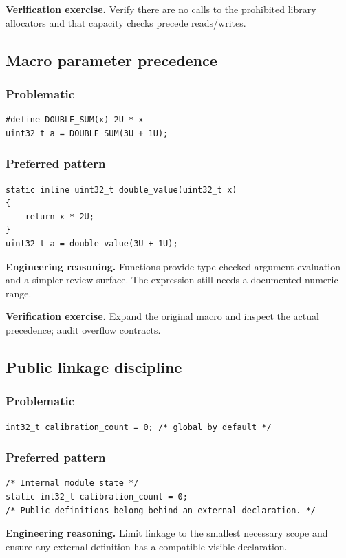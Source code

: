 \documentclass[10pt,letterpaper]{article}
\begin{document}
\textbf{Verification exercise.} Verify there are no calls to the prohibited library allocators and that capacity checks precede reads/writes.

\subsection{Macro parameter precedence}
\subsubsection*{Problematic}
\begin{lstlisting}[style=engineerc]
#define DOUBLE_SUM(x) 2U * x
uint32_t a = DOUBLE_SUM(3U + 1U);
\end{lstlisting}
\subsubsection*{Preferred pattern}
\begin{lstlisting}[style=engineerc]
static inline uint32_t double_value(uint32_t x)
{
    return x * 2U;
}
uint32_t a = double_value(3U + 1U);
\end{lstlisting}
\textbf{Engineering reasoning.} Functions provide type-checked argument evaluation and a simpler review surface. The expression still needs a documented numeric range.

\textbf{Verification exercise.} Expand the original macro and inspect the actual precedence; audit overflow contracts.

\subsection{Public linkage discipline}
\subsubsection*{Problematic}
\begin{lstlisting}[style=engineerc]
int32_t calibration_count = 0; /* global by default */
\end{lstlisting}
\subsubsection*{Preferred pattern}
\begin{lstlisting}[style=engineerc]
/* Internal module state */
static int32_t calibration_count = 0;
/* Public definitions belong behind an external declaration. */
\end{lstlisting}
\textbf{Engineering reasoning.} Limit linkage to the smallest necessary scope and ensure any external definition has a compatible visible declaration.
\end{document}
